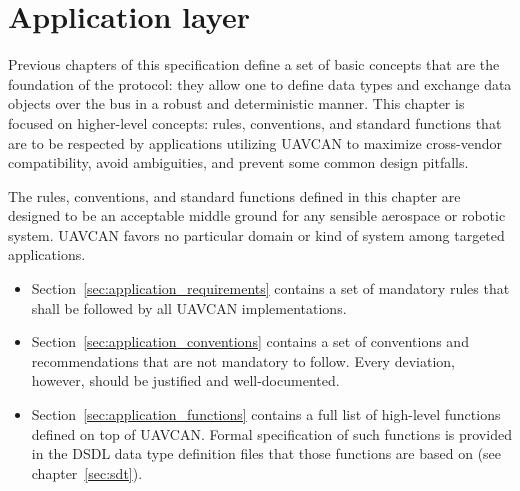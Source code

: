 \chapter{Application layer}\label{sec:application}

Previous chapters of this specification define a set of basic concepts that are the foundation of the protocol:
they allow one to define data types and exchange data objects over the bus in a robust and deterministic manner.
This chapter is focused on higher-level concepts: rules, conventions, and standard functions that are to be
respected by applications utilizing UAVCAN to maximize cross-vendor compatibility, avoid ambiguities, and
prevent some common design pitfalls.

The rules, conventions, and standard functions defined in this chapter are designed to be an acceptable middle
ground for any sensible aerospace or robotic system.
UAVCAN favors no particular domain or kind of system among targeted applications.

\begin{itemize}
    \item Section~\ref{sec:application_requirements} contains a set of mandatory rules that shall be
    followed by all UAVCAN implementations.

    \item Section~\ref{sec:application_conventions} contains a set of conventions and recommendations that
    are not mandatory to follow. Every deviation, however, should be justified and well-documented.

    \item Section~\ref{sec:application_functions} contains a full list of high-level functions defined on
    top of UAVCAN. Formal specification of such functions is provided in the DSDL data type definition files that
    those functions are based on (see chapter~\ref{sec:sdt}).
\end{itemize}

\clearpage
\clearpage
\clearpage
